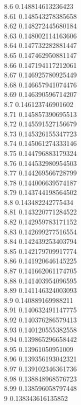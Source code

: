 {8.6	0.148814613236423\\
8.61	0.148543278385658\\
8.62	0.148272445680184\\
8.63	0.148002114163606\\
8.64	0.147732282881447\\
8.65	0.147462950881147\\
8.66	0.147194117212061\\
8.67	0.146925780925449\\
8.68	0.146657941074476\\
8.69	0.146390596714207\\
8.7	0.146123746901602\\
8.71	0.145857390695513\\
8.72	0.145591527156679\\
8.73	0.145326155347723\\
8.74	0.145061274333146\\
8.75	0.144796883179324\\
8.76	0.144532980954503\\
8.77	0.144269566728799\\
8.78	0.144006639574187\\
8.79	0.143744198564502\\
8.8	0.143482242775434\\
8.81	0.143220771284522\\
8.82	0.142959783171152\\
8.83	0.142699277516554\\
8.84	0.142439253403794\\
8.85	0.142179709917774\\
8.86	0.141920646145225\\
8.87	0.141662061174705\\
8.88	0.141403954096595\\
8.89	0.141146324003093\\
8.9	0.140889169988211\\
8.91	0.140632491147775\\
8.92	0.140376286579413\\
8.93	0.140120555382558\\
8.94	0.139865296658442\\
8.95	0.13961050951009\\
8.96	0.139356193042321\\
8.97	0.139102346361736\\
8.98	0.138848968576723\\
8.99	0.138596058797448\\
9	0.138343616135852\\
}
